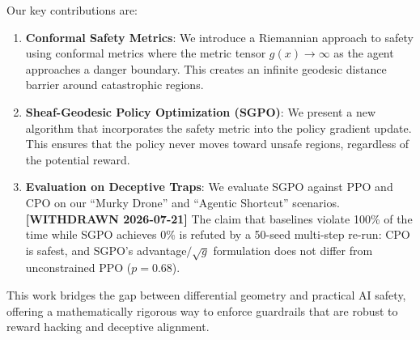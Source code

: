 Our key contributions are:
\begin{enumerate}
    \item \textbf{Conformal Safety Metrics}: We introduce a Riemannian approach to safety using conformal metrics where the metric tensor $g(x) \to \infty$ as the agent approaches a danger boundary. This creates an infinite geodesic distance barrier around catastrophic regions.
    
    \item \textbf{Sheaf-Geodesic Policy Optimization (SGPO)}: We present a new algorithm that incorporates the safety metric into the policy gradient update. This ensures that the policy never moves toward unsafe regions, regardless of the potential reward.
    
    \item \textbf{Evaluation on Deceptive Traps}: We evaluate SGPO against PPO \citep{schulman2017proximal} and CPO on our ``Murky Drone'' and ``Agentic Shortcut'' scenarios. \textbf{[WITHDRAWN 2026-07-21]} The claim that baselines violate 100\% of the time while SGPO achieves 0\% is refuted by a 50-seed multi-step re-run: CPO is safest, and SGPO's advantage$/\sqrt{g}$ formulation does not differ from unconstrained PPO ($p=0.68$).
\end{enumerate}

This work bridges the gap between differential geometry and practical AI safety, offering a mathematically rigorous way to enforce guardrails that are robust to reward hacking and deceptive alignment.

